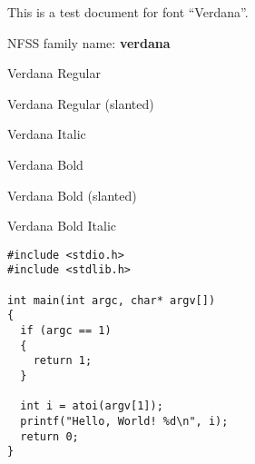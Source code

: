 \documentclass{jsarticle}
\begin{document}
{This is a test document for font ``Verdana''.}

NFSS family name: {\bfseries verdana}

{\selectfont Verdana Regular}\par
{\selectfont Verdana Regular (slanted)}\par
{\selectfont Verdana Italic}\par
{\selectfont Verdana Bold}\par
{\selectfont Verdana Bold (slanted)}\par
{\selectfont Verdana Bold Italic}\par

\renewcommand{\ttdefault}{verdana}

\begin{verbatim}
#include <stdio.h>
#include <stdlib.h>

int main(int argc, char* argv[])
{
  if (argc == 1)
  {
    return 1;
  }

  int i = atoi(argv[1]);
  printf("Hello, World! %d\n", i);
  return 0;
}
\end{verbatim}
\end{document}
